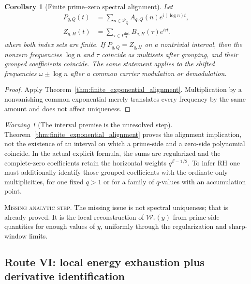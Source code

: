 \documentclass[11pt]{amsart}
\numberwithin{equation}{section}
\theoremstyle{plain}
\newtheorem{corollary}[theorem]{Corollary}
\theoremstyle{definition}
\theoremstyle{remark}
\newtheorem{warning}[theorem]{Warning}
\newcommand{\1}{\mathbf{1}}
\newcommand{\missingnote}[1]{%
  \par\smallskip\noindent
  \begingroup\footnotesize\textsc{Missing analytic step.} #1\endgroup
  \par\smallskip}
\begin{document}
\begin{corollary}[Finite prime--zero spectral alignment]
\label{cor:finite_prime_zero_alignment}
Let
\begin{align}
P_{q,Q}(t)
&=
\sum_{n\in\mathcal P_Q}A_{q,Q}(n)e^{i(\log n)t},
\label{eq:finite_prime_polynomial}
\\
Z_{q,H}(t)
&=
\sum_{\tau\in\Gamma_H^{\mathrm{dist}}}B_{q,H}(\tau)e^{i\tau t},
\label{eq:finite_zero_polynomial}
\end{align}
where both index sets are finite.  If \(P_{q,Q}=Z_{q,H}\) on a nontrivial
interval, then the nonzero frequencies \(\log n\) and \(\tau\) coincide as
multisets after grouping, and their grouped coefficients coincide.  The same
statement applies to the shifted frequencies \(\omega\pm\log n\) after a
common carrier modulation or demodulation.
\end{corollary}

\begin{proof}
Apply Theorem~\ref{thm:finite_exponential_alignment}.  Multiplication by a
nonvanishing common exponential merely translates every frequency by the
same amount and does not affect uniqueness.
\end{proof}

\begin{warning}[The interval premise is the unresolved step]
\label{warn:alignment_interval_premise}
Theorem~\ref{thm:finite_exponential_alignment} proves the alignment
implication, not the existence of an interval on which a prime-side and a
zero-side polynomial coincide.  In the actual explicit formula, the sums are
regularized and the complete-zero coefficients retain the horizontal weights
\(q^{\beta-1/2}\).  To infer RH one must additionally identify those grouped
coefficients with the ordinate-only multiplicities, for one fixed \(q>1\) or
for a family of \(q\)-values with an accumulation point.
\end{warning}

\missingnote{The missing issue is not spectral uniqueness; that is already
proved.  It is the local reconstruction of $\mathcal W_\tau(y)$ from
prime-side quantities for enough values of $y$, uniformly through the
regularization and sharp-window limits.}

\subsection{Route VI: local energy exhaustion plus derivative identification}
\label{subsec:route_energy_local}
\end{document}
